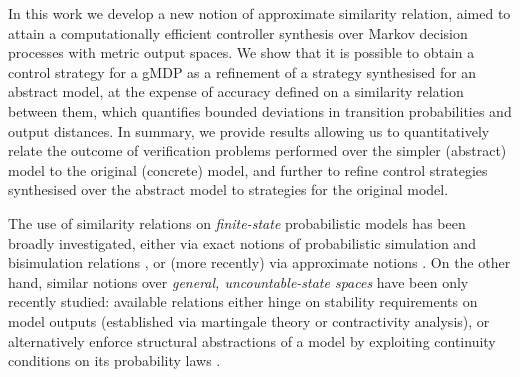 \documentclass[letterpaper, 10 pt, conference]{amsart}
\theoremstyle{definition}
\theoremstyle{example}
\theoremstyle{remark}
\begin{document}
In this work we develop a new notion of approximate similarity relation, 
aimed to attain a computationally efficient controller synthesis over Markov decision processes with metric output spaces. 
We show that it is possible to obtain a control strategy for a gMDP as a refinement of a strategy synthesised for an abstract model, 
at the expense of accuracy defined on a similarity relation between them, 
which quantifies bounded deviations in transition probabilities and output distances. 
In summary, 
we provide results allowing us to quantitatively relate the outcome of verification problems performed over the simpler (abstract) model to the original (concrete) model, 
and further to refine control strategies synthesised over the abstract model to strategies for the original model.

\smallskip 

The use of similarity relations on \emph{finite-state} probabilistic models has been broadly investigated, 
either via exact notions of probabilistic simulation and bisimulation relations  
\cite{larsen1991bisimulation,Segala1995,Segala1995a},   
or (more recently) via approximate notions \cite{Desharnais2008,cDAK12}. 
On the other hand, 
similar notions over \emph{general, uncountable-state spaces} have been only recently studied:  
available relations either hinge on stability requirements on model outputs \cite{Julius2009a,ZMMAL14} (established via martingale theory or contractivity analysis), 
or alternatively enforce structural abstractions of a model \cite{desharnais2004metrics} by exploiting continuity conditions on its probability laws \cite{Abate2011,bcAKNP14}.  
\end{document}
